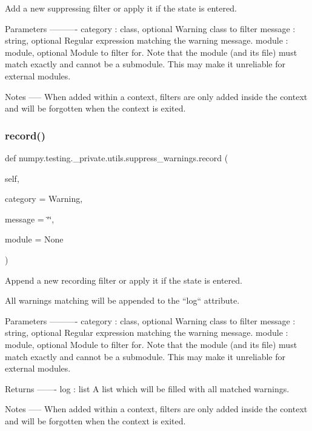 \begin{DoxyVerb}Add a new suppressing filter or apply it if the state is entered.

Parameters
----------
category : class, optional
    Warning class to filter
message : string, optional
    Regular expression matching the warning message.
module : module, optional
    Module to filter for. Note that the module (and its file)
    must match exactly and cannot be a submodule. This may make
    it unreliable for external modules.

Notes
-----
When added within a context, filters are only added inside
the context and will be forgotten when the context is exited.
\end{DoxyVerb}
 \mbox{\label{classnumpy_1_1testing_1_1__private_1_1utils_1_1suppress__warnings_a6e409dc03b96a9a48ee0f6ae4f5dd56a}} 
\subsubsection{\texorpdfstring{record()}{record()}}
{\footnotesize\ttfamily def numpy.\+testing.\+\_\+private.\+utils.\+suppress\+\_\+warnings.\+record (\begin{DoxyParamCaption}\item[{}]{self,  }\item[{}]{category = {\ttfamily Warning},  }\item[{}]{message = {\ttfamily \char`\"{}\char`\"{}},  }\item[{}]{module = {\ttfamily None} }\end{DoxyParamCaption})}

\begin{DoxyVerb}Append a new recording filter or apply it if the state is entered.

All warnings matching will be appended to the ``log`` attribute.

Parameters
----------
category : class, optional
    Warning class to filter
message : string, optional
    Regular expression matching the warning message.
module : module, optional
    Module to filter for. Note that the module (and its file)
    must match exactly and cannot be a submodule. This may make
    it unreliable for external modules.

Returns
-------
log : list
    A list which will be filled with all matched warnings.

Notes
-----
When added within a context, filters are only added inside
the context and will be forgotten when the context is exited.
\end{DoxyVerb}
 

